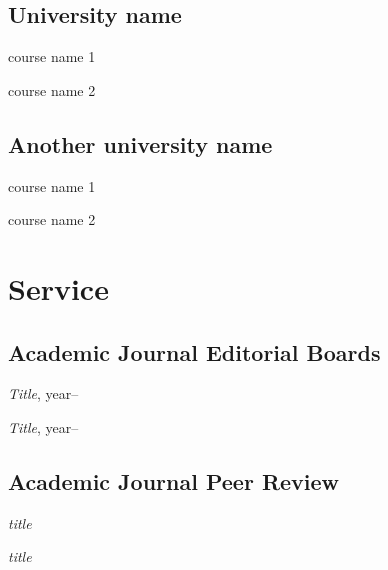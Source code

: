 \documentclass[12pt,letterpaper]{report}
\newcommand{\listitemspace}{0.25em}
\renewenvironment{itemize}
{\begin{list}{}{\setlength{\leftmargin}{0em}
                \setlength{\parskip}{0em}
                \setlength{\itemsep}{\listitemspace}
                \setlength{\parsep}{\listitemspace}}}
{\end{list}}
\begin{document}
    \subsection*{University name}

    \begin{itemize}

        \item course name 1
        \item course name 2

    \end{itemize}

    \subsection*{Another university name}

    \begin{itemize}

        \item course name 1
        \item course name 2

    \end{itemize}
    
    \section*{Service}

    \subsection*{Academic Journal Editorial Boards}

    \begin{itemize}

        \item \textit{Title}, year--
        \item \textit{Title}, year--

    \end{itemize}

    \subsection*{Academic Journal Peer Review}

    \begin{itemize}

        \item \textit{title}
        \item \textit{title}

    \end{itemize}
\end{document}
